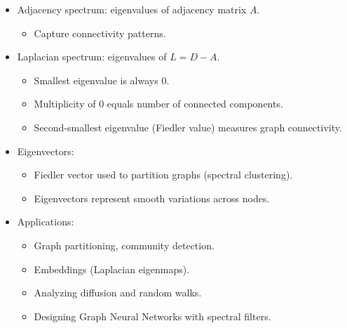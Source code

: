\documentclass[
  letterpaper,
  DIV=11,
  numbers=noendperiod]{scrreprt}
\providecommand{\tightlist}{%
  \setlength{\itemsep}{0pt}\setlength{\parskip}{0pt}}
\begin{document}
\begin{itemize}
\item
  Adjacency spectrum: eigenvalues of adjacency matrix \(A\).

  \begin{itemize}
  \tightlist
  \item
    Capture connectivity patterns.
  \end{itemize}
\item
  Laplacian spectrum: eigenvalues of \(L=D-A\).

  \begin{itemize}
  \tightlist
  \item
    Smallest eigenvalue is always 0.
  \item
    Multiplicity of 0 equals number of connected components.
  \item
    Second-smallest eigenvalue (Fiedler value) measures graph
    connectivity.
  \end{itemize}
\item
  Eigenvectors:

  \begin{itemize}
  \tightlist
  \item
    Fiedler vector used to partition graphs (spectral clustering).
  \item
    Eigenvectors represent smooth variations across nodes.
  \end{itemize}
\item
  Applications:

  \begin{itemize}
  \tightlist
  \item
    Graph partitioning, community detection.
  \item
    Embeddings (Laplacian eigenmaps).
  \item
    Analyzing diffusion and random walks.
  \item
    Designing Graph Neural Networks with spectral filters.
  \end{itemize}
\end{itemize}
\end{document}

